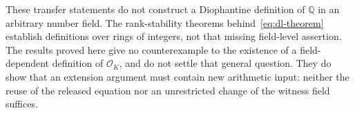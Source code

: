 These transfer statements do not construct a Diophantine definition of
$\mathbb Q$ in an arbitrary number field.  The rank-stability theorems
behind~\eqref{eq:dl-theorem} establish definitions over rings of integers,
not that missing field-level assertion.  The results proved here give
no counterexample to the existence of a field-dependent definition of
$\mathcal O_K$, and do not settle that general question.  They do show
that an extension argument must contain new arithmetic input: neither
the reuse of the released equation nor an unrestricted change of the
witness field suffices.
